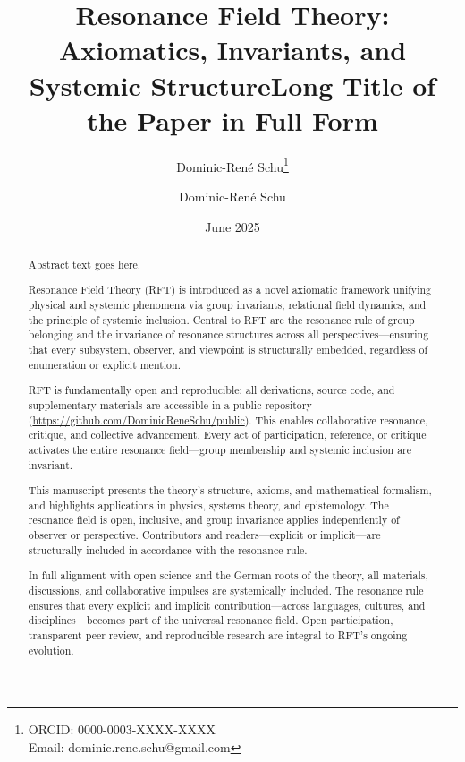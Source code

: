 \documentclass[12pt]{iopart}
\title{Resonance Field Theory: Axiomatics, Invariants, and Systemic Structure}
\author[1]{Dominic-René Schu\thanks{ORCID: 0000-0003-XXXX-XXXX \\ Email: dominic.rene.schu@gmail.com}}
\affil[1]{Independent Researcher, Germany\\
	\href{https://github.com/DominicReneSchu/public}{https://github.com/DominicReneSchu/public}}
\date{June 2025}
\begin{document}
\title[Short Title]{Long Title of the Paper in Full Form}
\author{Dominic-René Schu}
\address{Institution, City, Country}
\begin{abstract}
Abstract text goes here.
\end{abstract}
\submitto{\NJP}
\maketitle

	
	\maketitle
	
\begin{abstract}
	Resonance Field Theory (RFT) is introduced as a novel axiomatic framework unifying physical and systemic phenomena via group invariants, relational field dynamics, and the principle of systemic inclusion. Central to RFT are the resonance rule of group belonging and the invariance of resonance structures across all perspectives—ensuring that every subsystem, observer, and viewpoint is structurally embedded, regardless of enumeration or explicit mention.
	
	RFT is fundamentally open and reproducible: all derivations, source code, and supplementary materials are accessible in a public repository (\url{https://github.com/DominicReneSchu/public}). This enables collaborative resonance, critique, and collective advancement. Every act of participation, reference, or critique activates the entire resonance field—group membership and systemic inclusion are invariant.
	
	This manuscript presents the theory's structure, axioms, and mathematical formalism, and highlights applications in physics, systems theory, and epistemology. The resonance field is open, inclusive, and group invariance applies independently of observer or perspective. Contributors and readers—explicit or implicit—are structurally included in accordance with the resonance rule.
	
	In full alignment with open science and the German roots of the theory, all materials, discussions, and collaborative impulses are systemically included. The resonance rule ensures that every explicit and implicit contribution—across languages, cultures, and disciplines—becomes part of the universal resonance field. Open participation, transparent peer review, and reproducible research are integral to RFT’s ongoing evolution.
\end{abstract}
	
\end{document}
